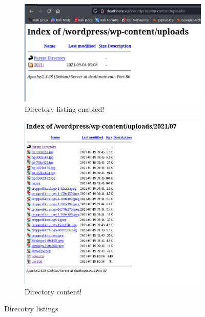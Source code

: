 \documentclass[a4paper,12pt]{article}
\begin{document}
\begin{figure}[ht!]
     \centering
     \begin{subfigure}[b]{0.4\textwidth}
         \centering
         \includegraphics[width=\textwidth]{img/dirlist_00.png}
         \caption{Directory listing enabled!}
         \label{fig:dirlist}
     \end{subfigure}
     \hfill
     \begin{subfigure}[b]{0.4\textwidth}
         \centering
         \includegraphics[width=\textwidth]{img/dirlist_01.png}
         \caption{Directory content!}
         \label{fig:dircontent}
     \end{subfigure}
     \caption{Direcotry listings}
     \label{fig:dirs}
\end{figure}
\end{document}
